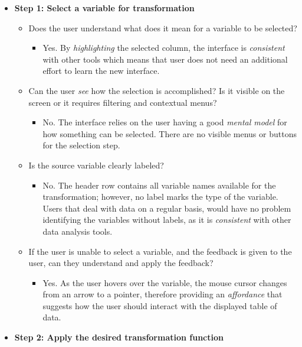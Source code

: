 \documentclass[12pt,letterpaper]{article}
\begin{document}
\begin{itemize}
    \item \textbf{Step 1: Select a variable for transformation}
    \begin{itemize}
        \item Does the user understand what does it mean for a variable to be selected?
        \begin{itemize}
            \item Yes. By \textit{highlighting} the selected column, the interface is \textit{consistent} with other tools which means that user does not need an additional effort to learn the new interface. 
        \end{itemize}
        \item Can the user \textit{see} how the selection is accomplished? Is it visible on the screen or it requires filtering and contextual menus?
        \begin{itemize}
            \item No. The interface relies on the user having a good \textit{mental model} for how something can be selected. There are no visible menus or buttons for the selection step.  
        \end{itemize}
        \item Is the source variable clearly labeled?
            \begin{itemize}
                \item No. The header row contains all variable names available for the transformation; however, no label marks the type of the variable. Users that deal with data on a regular basis, would have no problem identifying the variables without labels, as it is \textit{consistent} with other data analysis tools.    
        \end{itemize}
        \item If the user is unable to select a variable, and the feedback is given to the user, can they understand and apply the feedback? 
        \begin{itemize}
                \item Yes. As the user hovers over the variable, the mouse cursor changes from an arrow to a pointer, therefore providing an \textit{affordance} that suggests how the user should interact with the displayed table of data.
        \end{itemize}
    \end{itemize}
    \item \textbf{Step 2: Apply the desired transformation function}

\end{itemize}
\end{document}

